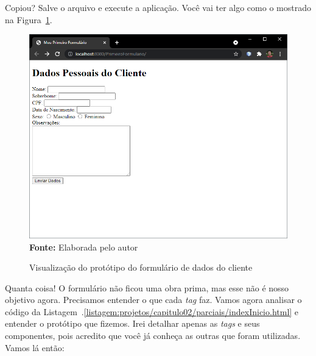 
Copiou? Salve o arquivo e execute a aplicação. Você vai ter algo como o mostrado na Figura~\ref{fig:cap02PrimeiroFormulario}.

\FloatBarrier
\begin{figure}[!htbp]
    \centering
    \caption{Visualização do protótipo do formulário de dados do cliente}
    \includegraphics[scale=0.7]{imagens/cap02PrimeiroFormulario}
    \\\textbf{Fonte:} Elaborada pelo autor
    \label{fig:cap02PrimeiroFormulario}
\end{figure}
\FloatBarrier

Quanta coisa! O formulário não ficou uma obra prima, mas esse não é nosso objetivo agora. Precisamos entender o que cada \textit{tag} faz. Vamos agora analisar o código da Listagem~\thechapter.\ref{listagem:projetos/capitulo02/parciais/indexInicio.html} e entender o protótipo que fizemos. Irei detalhar apenas as \textit{tags}  e seus componentes, pois acredito que você já conheça as outras que foram utilizadas. Vamos lá então:

